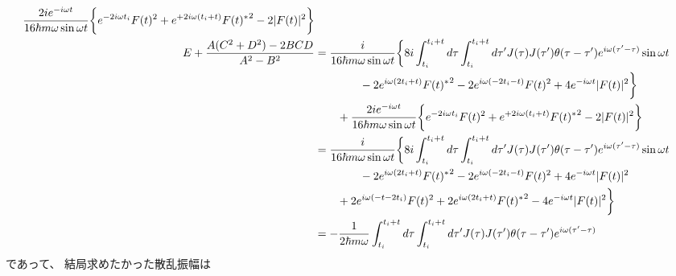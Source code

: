 \begin{align}
    \dfrac{
        2 i
        e^{- i \omega t}
    }{16 \hbar m \omega \sin \omega t}
    \bigg\{
        e^{- 2 i \omega t_i}
        F(t)^2
    +
        e^{+ 2 i \omega (t_i + t)} {F(t)^*}^2
    - 2
        | F(t) |^2
    \bigg\}
\notag\\
    E
    +
    \dfrac{
        A ( C^2 + D^2 )
    -
        2 BCD
    }{
        A^2 - B^2
    }
    &=
    \dfrac{i}{16 \hbar m \omega \sin \omega t}
    \bigg\{
    8 i
    \int_{t_i}^{t_i + t}
        d\tau
    \int_{t_i}^{t_i + t}
        d\tau'
    J(\tau) J(\tau')
    \theta(\tau - \tau')
        e^{ i \omega (\tau' - \tau) }
    \sin \omega t
\notag\\&\qquad\qquad
    -
    2
        e^{ i \omega (2 t_i + t) }
        { F(t)^* }^2
    - 2
        e^{ i \omega ( - 2 t_i - t) }
        F(t)^2
    + 4
        e^{ - i \omega t }
        | F(t) |^2
    \bigg\}
\notag\\&\qquad
        +
        \dfrac{
            2 i
            e^{- i \omega t}
        }{16 \hbar m \omega \sin \omega t}
        \bigg\{
            e^{- 2 i \omega t_i}
            F(t)^2
        +
            e^{+ 2 i \omega (t_i + t)} {F(t)^*}^2
        - 2
        | F(t) |^2
    \bigg\}
\notag\\&
    =
    \dfrac{i}{16 \hbar m \omega \sin \omega t}
    \bigg\{
    8 i
    \int_{t_i}^{t_i + t}
        d\tau
    \int_{t_i}^{t_i + t}
        d\tau'
    J(\tau) J(\tau')
    \theta(\tau - \tau')
        e^{ i \omega (\tau' - \tau) }
    \sin \omega t
\notag\\&\qquad\qquad
    -
    2
        e^{ i \omega (2 t_i + t) }
        { F(t)^* }^2
    - 2
        e^{ i \omega ( - 2 t_i - t) }
        F(t)^2
    + 4
        e^{ - i \omega t }
        | F(t) |^2
\notag\\&\qquad
        +
            2
            e^{i \omega (- t - 2 t_i)}
            F(t)^2
        +
            2
            e^{i \omega (2 t_i + t)} {F(t)^*}^2
        - 4
            e^{- i \omega t}
        | F(t) |^2
    \bigg\}
\notag\\&
    =
    -
    \dfrac{1}{2 \hbar m \omega}
    \int_{t_i}^{t_i + t}
        d\tau
    \int_{t_i}^{t_i + t}
        d\tau'
    J(\tau) J(\tau')
    \theta(\tau - \tau')
        e^{ i \omega (\tau' - \tau) }
\end{align}
であって、
結局求めたかった散乱振幅は
